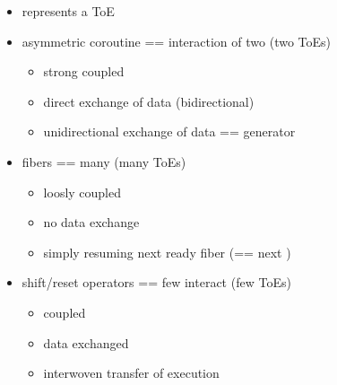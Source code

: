 \label{appendixb}
\begin{itemize}
\item \ectx represents a ToE
\item asymmetric coroutine == interaction of two \ectx (two ToEs)
    \begin{itemize}
        \item strong coupled
        \item direct exchange of data (bidirectional)
        \item unidirectional exchange of data == generator
    \end{itemize}
\item fibers == many \ectx (many ToEs)
    \begin{itemize}
        \item loosly coupled
        \item no data exchange
        \item simply resuming next ready fiber (== next \ectx)
    \end{itemize}
\item shift/reset operators == few \ectx interact (few ToEs)
    \begin{itemize}
        \item coupled
        \item data exchanged
        \item interwoven transfer of execution
    \end{itemize}
\end{itemize}
